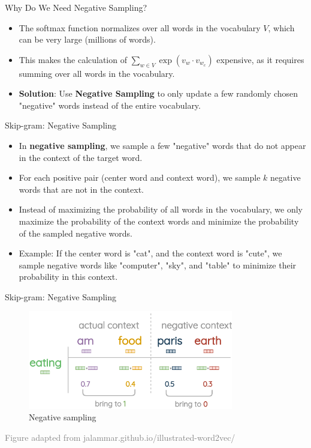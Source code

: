 \documentclass[serif, aspectratio=169]{beamer}
\begin{document}
\begin{frame}{Why Do We Need Negative Sampling?}
    \begin{itemize}
        \item The softmax function normalizes over all words in the vocabulary \(V\), which can be very large (millions of words).
        \item This makes the calculation of \(\sum_{w \in V} \exp(v_w \cdot v_{w_c})\) expensive, as it requires summing over all words in the vocabulary.
        \item \textbf{Solution}: Use \textbf{Negative Sampling} to only update a few randomly chosen "negative" words instead of the entire vocabulary.
    \end{itemize}
\end{frame}

\begin{frame}{Skip-gram: Negative Sampling}
    \begin{itemize}
        \item In \textbf{negative sampling}, we sample a few "negative" words that do not appear in the context of the target word.
        \item For each positive pair (center word and context word), we sample \(k\) negative words that are not in the context.
        \item Instead of maximizing the probability of all words in the vocabulary, we only maximize the probability of the context words and minimize the probability of the sampled negative words.
        \item Example: If the center word is "cat", and the context word is "cute", we sample negative words like "computer", "sky", and "table" to minimize their probability in this context.
    \end{itemize}
\end{frame}

\begin{frame}{Skip-gram: Negative Sampling}
	\begin{figure}
		\centering
		\includegraphics[width=0.8\textwidth]{pic/skip_negative.png}
		\caption*{Negative sampling}
	\end{figure}
	\vspace{0.6cm}
	\hspace{-1.0cm}
	{\tiny \textcolor{gray}{Figure adapted from jalammar.github.io/illustrated-word2vec/}}
\end{frame}
\end{document}
